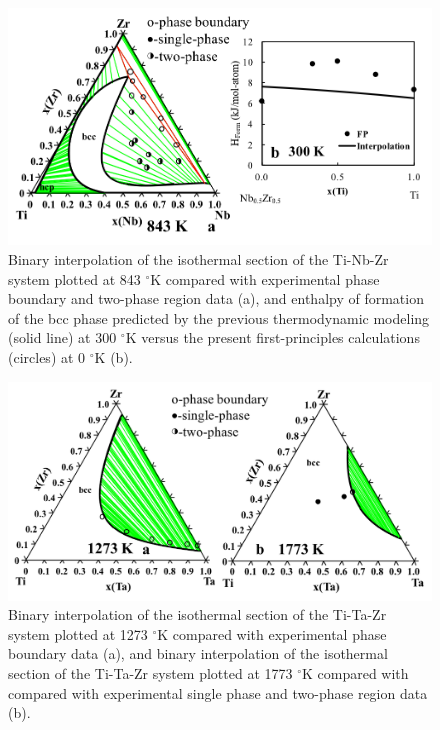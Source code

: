 \newpage
\begin{figure}[H]
	\centering
	\includegraphics[width=\textwidth]{Chapter-3/Figures/TiNbZr.png}
	\caption{Binary interpolation of the isothermal section of the Ti-Nb-Zr system plotted at 843 $^{\circ}$K compared with experimental phase boundary and two-phase region data \cite{Tokunaga2007} (a), and enthalpy of formation of the bcc phase predicted by the previous thermodynamic modeling (solid line) at 300 $^{\circ}$K versus the present first-principles calculations (circles) at 0 $^{\circ}$K (b).}
	\label{Ch3-figure:TiNbZr}
\end{figure}

\newpage
\begin{figure}[H]
	\centering
	\includegraphics[width=\textwidth]{Chapter-3/Figures/TiTaZr1.png}
	\caption{Binary interpolation of the isothermal section of the Ti-Ta-Zr system plotted at 1273 $^{\circ}$K compared with experimental phase boundary data \cite{Lin1996,Hoch1964} (a), and binary interpolation of the isothermal section of the Ti-Ta-Zr system plotted at 1773 $^{\circ}$K compared with compared with experimental single phase and two-phase region data \cite{Lin1996,Hoch1964} (b).}
	\label{Ch3-figure:TiTaZr1}
\end{figure}

